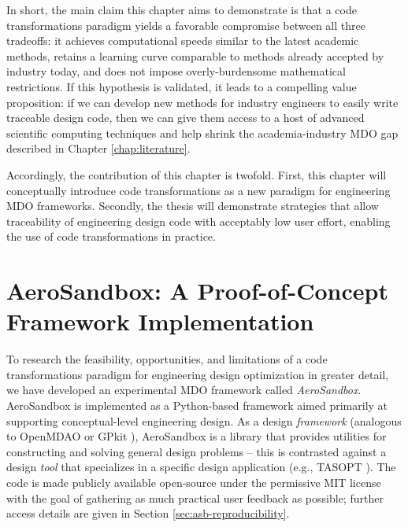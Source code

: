 In short, the main claim this chapter aims to demonstrate is that a code transformations paradigm yields a favorable compromise between all three tradeoffs: it achieves computational speeds similar to the latest academic methods, retains a learning curve comparable to methods already accepted by industry today, and does not impose overly-burdensome mathematical restrictions. If this hypothesis is validated, it leads to a compelling value proposition: if we can develop new methods for industry engineers to easily write traceable design code, then we can give them access to a host of advanced scientific computing techniques and help shrink the academia-industry MDO gap described in Chapter \ref{chap:literature}.

Accordingly, the contribution of this chapter is twofold. First, this chapter will conceptually introduce code transformations as a new paradigm for engineering MDO frameworks. Secondly, the thesis will demonstrate strategies that allow traceability of engineering design code with acceptably low user effort, enabling the use of code transformations in practice.








\section{AeroSandbox: A Proof-of-Concept Framework Implementation}

To research the feasibility, opportunities, and limitations of a code transformations paradigm for engineering design optimization in greater detail, we have developed an experimental MDO framework called \emph{AeroSandbox}. AeroSandbox is implemented as a Python-based framework aimed primarily at supporting conceptual-level engineering design. As a design \emph{framework} (analogous to OpenMDAO \cite{gray_openmdao_2019} or GPkit \cite{gpkit}), AeroSandbox is a library that provides utilities for constructing and solving general design problems -- this is contrasted against a design \emph{tool} that specializes in a specific design application (e.g., TASOPT \cite{drela_tasopt_2010}). The code is made publicly available open-source under the permissive MIT license with the goal of gathering as much practical user feedback as possible; further access details are given in Section \ref{sec:asb-reproducibility}.

